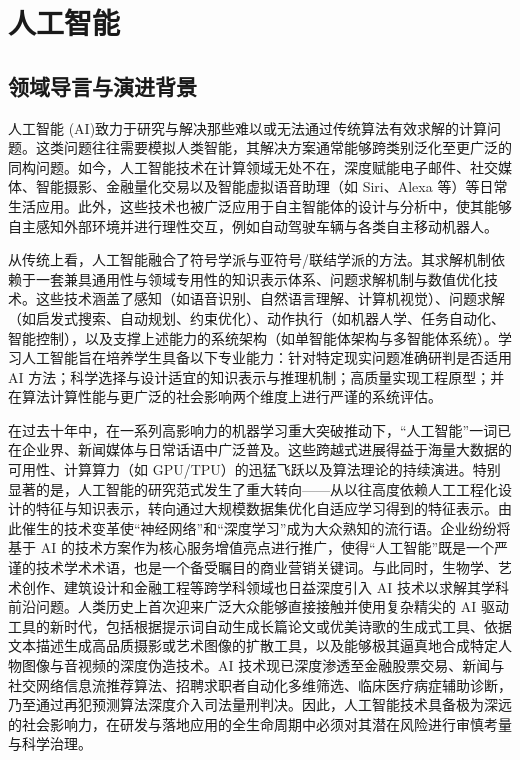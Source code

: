 \chapter{人工智能}

\section{领域导言与演进背景}

\begin{preamblebox}[知识领域概述与变革]
人工智能 (AI)致力于研究与解决那些难以或无法通过传统算法有效求解的计算问题。这类问题往往需要模拟人类智能，其解决方案通常能够跨类别泛化至更广泛的同构问题。如今，人工智能技术在计算领域无处不在，深度赋能电子邮件、社交媒体、智能摄影、金融量化交易以及智能虚拟语音助理（如 Siri、Alexa 等）等日常生活应用。此外，这些技术也被广泛应用于自主智能体的设计与分析中，使其能够自主感知外部环境并进行理性交互，例如自动驾驶车辆与各类自主移动机器人。

从传统上看，人工智能融合了符号学派与亚符号/联结学派的方法。其求解机制依赖于一套兼具通用性与领域专用性的知识表示体系、问题求解机制与数值优化技术。这些技术涵盖了感知（如语音识别、自然语言理解、计算机视觉）、问题求解（如启发式搜索、自动规划、约束优化）、动作执行（如机器人学、任务自动化、智能控制），以及支撑上述能力的系统架构（如单智能体架构与多智能体系统）。学习人工智能旨在培养学生具备以下专业能力：针对特定现实问题准确研判是否适用 AI 方法；科学选择与设计适宜的知识表示与推理机制；高质量实现工程原型；并在算法计算性能与更广泛的社会影响两个维度上进行严谨的系统评估。

在过去十年中，在一系列高影响力的机器学习重大突破推动下，“人工智能”一词已在企业界、新闻媒体与日常话语中广泛普及。这些跨越式进展得益于海量大数据的可用性、计算算力（如 GPU/TPU）的迅猛飞跃以及算法理论的持续演进。特别显著的是，人工智能的研究范式发生了重大转向——从以往高度依赖人工工程化设计的特征与知识表示，转向通过大规模数据集优化自适应学习得到的特征表示。由此催生的技术变革使“神经网络”和“深度学习”成为大众熟知的流行语。企业纷纷将基于 AI 的技术方案作为核心服务增值亮点进行推广，使得“人工智能”既是一个严谨的技术学术术语，也是一个备受瞩目的商业营销关键词。与此同时，生物学、艺术创作、建筑设计和金融工程等跨学科领域也日益深度引入 AI 技术以求解其学科前沿问题。人类历史上首次迎来广泛大众能够直接接触并使用复杂精尖的 AI 驱动工具的新时代，包括根据提示词自动生成长篇论文或优美诗歌的生成式工具、依据文本描述生成高品质摄影或艺术图像的扩散工具，以及能够极其逼真地合成特定人物图像与音视频的深度伪造技术。AI 技术现已深度渗透至金融股票交易、新闻与社交网络信息流推荐算法、招聘求职者自动化多维筛选、临床医疗病症辅助诊断，乃至通过再犯预测算法深度介入司法量刑判决。因此，人工智能技术具备极为深远的社会影响力，在研发与落地应用的全生命周期中必须对其潜在风险进行审慎考量与科学治理。


\end{preamblebox}
